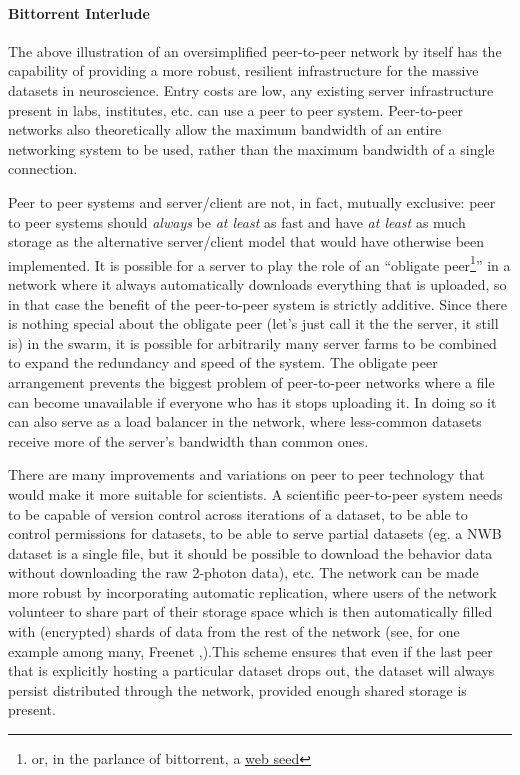 \documentclass{article}
\begin{document}
\hypertarget{bittorrent-interlude}{%
\paragraph{Bittorrent Interlude}\label{bittorrent-interlude}}

The above illustration of an oversimplified peer-to-peer network by
itself has the capability of providing a more robust, resilient
infrastructure for the massive datasets in neuroscience. Entry costs are
low, any existing server infrastructure present in labs, institutes,
etc. can use a peer to peer system. Peer-to-peer networks also
theoretically allow the maximum bandwidth of an entire networking system
to be used, rather than the maximum bandwidth of a single connection.

Peer to peer systems and server/client are not, in fact, mutually
exclusive: peer to peer systems should \emph{always} be \emph{at least}
as fast and have \emph{at least} as much storage as the alternative
server/client model that would have otherwise been implemented. It is
possible for a server to play the role of an ``obligate
peer\footnote{or, in the parlance of bittorrent, a
  \href{https://en.wikipedia.org/wiki/BitTorrent\#Web_seeding}{web seed}}''
in a network where it always automatically downloads everything that is
uploaded, so in that case the benefit of the peer-to-peer system is
strictly additive. Since there is nothing special about the obligate
peer (let's just call it the the server, it still is) in the swarm, it
is possible for arbitrarily many server farms to be combined to expand
the redundancy and speed of the system. The obligate peer arrangement
prevents the biggest problem of peer-to-peer networks where a file can
become unavailable if everyone who has it stops uploading it. In doing
so it can also serve as a load balancer in the network, where
less-common datasets receive more of the server's bandwidth than common
ones.

There are many improvements and variations on peer to peer technology
that would make it more suitable for scientists. A scientific
peer-to-peer system needs to be capable of version control across
iterations of a dataset, to be able to control permissions for datasets,
to be able to serve partial datasets (eg. a NWB dataset is a single
file, but it should be possible to download the behavior data without
downloading the raw 2-photon data), etc. The network can be made more
robust by incorporating automatic replication, where users of the
network volunteer to share part of their storage space which is then
automatically filled with (encrypted) shards of data from the rest of
the network (see, for one example among many, Freenet \cite{clarkeFreenetDistributedAnonymous2001},).This scheme ensures that
even if the last peer that is explicitly hosting a particular dataset
drops out, the dataset will always persist distributed through the
network, provided enough shared storage is present.
\end{document}
